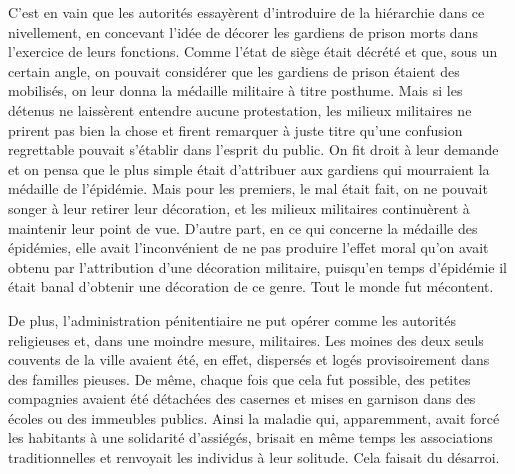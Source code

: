 \documentclass[french,twoside]{book} %
\begin{document}
C’est en vain que les autorités essayèrent d’introduire de la hiérarchie dans ce nivellement, en concevant l’idée de décorer les gardiens de prison morts dans l’exercice de leurs fonctions. Comme l’état de siège était décrété et que, sous un certain angle, on pouvait considérer que les gardiens de prison étaient des mobilisés, on leur donna la médaille militaire à titre posthume. Mais si les détenus ne laissèrent entendre aucune protestation, les milieux militaires ne prirent pas bien la chose et firent remarquer à juste titre qu’une confusion regrettable pouvait s’établir dans l’esprit du public. On fit droit à leur demande et on pensa que le plus simple était d’attribuer aux gardiens qui mourraient la médaille de l’épidémie. Mais pour les premiers, le mal était fait, on ne pouvait songer à leur retirer leur décoration, et les milieux militaires continuèrent à maintenir leur point de vue. D’autre part, en ce qui concerne la médaille des épidémies, elle avait l’inconvénient de ne pas produire l’effet moral qu’on avait obtenu par l’attribution d’une décoration militaire, puisqu’en temps d’épidémie il était banal d’obtenir une décoration de ce genre. Tout le monde fut mécontent.\par
De plus, l’administration pénitentiaire ne put opérer comme les autorités religieuses et, dans une moindre mesure, militaires. Les moines des deux seuls couvents de la ville avaient été, en effet, dispersés et logés provisoirement dans des familles pieuses. De même, chaque fois que cela fut possible, des petites compagnies avaient été détachées des casernes et mises en garnison dans des écoles ou des immeubles publics. Ainsi la maladie qui, apparemment, avait forcé les habitants à une solidarité d’assiégés, brisait en même temps les associations traditionnelles et renvoyait les individus à leur solitude. Cela faisait du désarroi.\par
\end{document}

